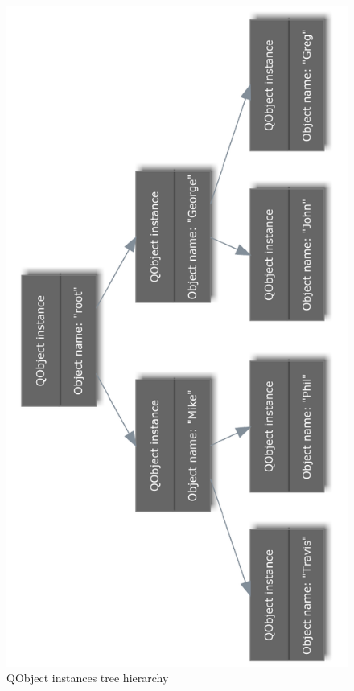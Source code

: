 \begin{figure}[ht]
\centering
\includegraphics[angle=-90,width=13cm]{graphics/laboratory/12-modeltree.pdf}
\caption{QObject instances tree hierarchy}\label{figure:modeltree}
\end{figure}

